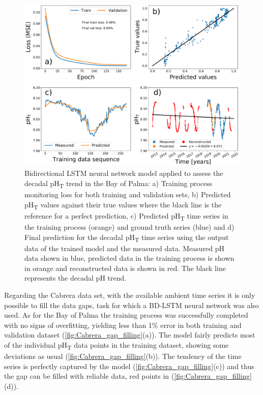\begin{figure}[H]
    \centering
    \includegraphics[width=1\textwidth]{Figures/Best_bidirectional_LSTM.pdf}
    \caption[Deep learning model applied to assess the
        decadal pH\textsubscript{T} trend in the Bay of Palma]{Bidirectional
        LSTM
        neural network model applied to assess the
        decadal pH\textsubscript{T} trend in the Bay of Palma: a) Training
        process
        monitoring loss for both training and validation sets, b) Predicted
        pH\textsubscript{T} values against their true values where the black
        line is
        the reference for a perfect prediction, c) Predicted
        pH\textsubscript{T} time
        series in the training process (orange) and ground truth series (blue)
        and d)
        Final prediction for the decadal pH\textsubscript{T} time series using
        the
        output data of the trained model and the measured data. Measured pH
        data shown
        in blue, predicted data in the training process is shown in orange and
        reconstructed data is shown in red. The black line represents the
        decadal pH
        trend.}
    \label{fig:best_LSTM}
\end{figure}

Regarding the Cabrera data set, with the available ambient time series it
is only possible to fill the data gaps, task for which a BD-LSTM neural network
was also used. As for the Bay of Palma the training process was successfully
completed with no signs of overfitting, yielding less than 1\% error in both
training and validation dataset (\cref{fig:Cabrera_gap_filling}(a)). The model
fairly predicts most of the individual pH\textsubscript{T} data points in the
training dataset, showing some deviations as usual
(\cref{fig:Cabrera_gap_filling}(b)). The tendency of the time series is
perfectly captured by the model (\cref{fig:Cabrera_gap_filling}(c)) and thus
the gap can be filled with reliable data, red points in
(\cref{fig:Cabrera_gap_filling}(d)).

